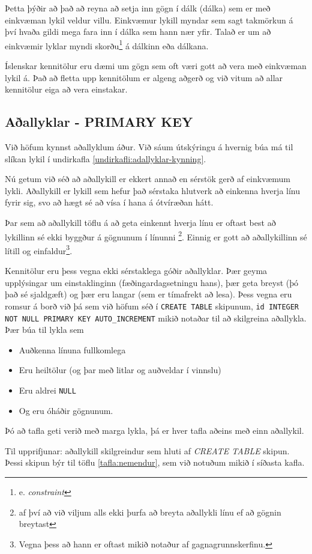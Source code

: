 Þetta þýðir að það að reyna að setja inn gögn í dálk (dálka) sem er með einkvæman lykil veldur villu. Einkvæmur lykill myndar sem sagt takmörkun á því hvaða gildi mega fara inn í dálka sem hann nær yfir. Talað er um að einkvæmir lyklar myndi skorðu\footnote{e. \emph{constraint}} á dálkinn eða dálkana.

Íslenskar kennitölur eru dæmi um gögn sem oft væri gott að vera með einkvæman lykil á. Það að fletta upp kennitölum er algeng aðgerð og við vitum að allar kennitölur eiga að vera einstakar.
\subsection{Aðallyklar - PRIMARY KEY}
\label{undirkafli:adallyklar}
Við höfum kynnst aðallyklum áður. Við sáum útskýringu á hvernig búa má til slíkan lykil í undirkafla \ref{undirkafli:adallyklar-kynning}.

Nú getum við séð að aðallykill er ekkert annað en sérstök gerð af einkvæmum lykli. Aðallykill er lykill sem hefur það sérstaka hlutverk að einkenna hverja línu fyrir sig, svo að hægt sé að vísa í hana á ótvíræðan hátt.

Þar sem að aðallykill töflu á að geta einkennt hverja línu er oftast best að lykillinn sé ekki byggður á gögnunum í línunni \footnote{af því að við viljum alls ekki þurfa að breyta aðallykli línu ef að gögnin breytast}. Einnig er gott að aðallykillinn sé lítill og einfaldur\footnote{Vegna þess að hann er oftast mikið notaður af gagnagrunnskerfinu.}. 

Kennitölur eru þess vegna ekki sérstaklega góðir aðallyklar. Þær geyma upplýsingar um einstaklinginn (fæðingardagsetningu hans), þær geta breyst (þó það sé sjaldgæft) og þær eru langar (sem er tímafrekt að lesa). Þess vegna eru romsur á borð við þá sem við höfum séð í \verb|CREATE TABLE| skipunum, \verb|id INTEGER NOT NULL PRIMARY KEY AUTO_INCREMENT| mikið notaðar til að skilgreina aðallykla. Þær búa til lykla sem 
\begin{itemize}
 \item Auðkenna línuna fullkomlega
 \item Eru heiltölur (og þar með litlar og auðveldar í vinnslu)
 \item Eru aldrei \verb|NULL|
 \item Og eru óháðir gögnunum.
\end{itemize}
Þó að tafla geti verið með marga lykla, þá er hver tafla aðeins með einn aðallykil.

\begin{example}
\caption[PRIMARY KEY]{Til upprifjunar: aðallykill skilgreindur sem hluti af \emph{CREATE TABLE} skipun. Þessi skipun býr til töflu \ref{tafla:nemendur}, sem við notuðum mikið í síðasta kafla.}
\label{sql:k5d1-primary-key}
\centering
{}
\end{example}
